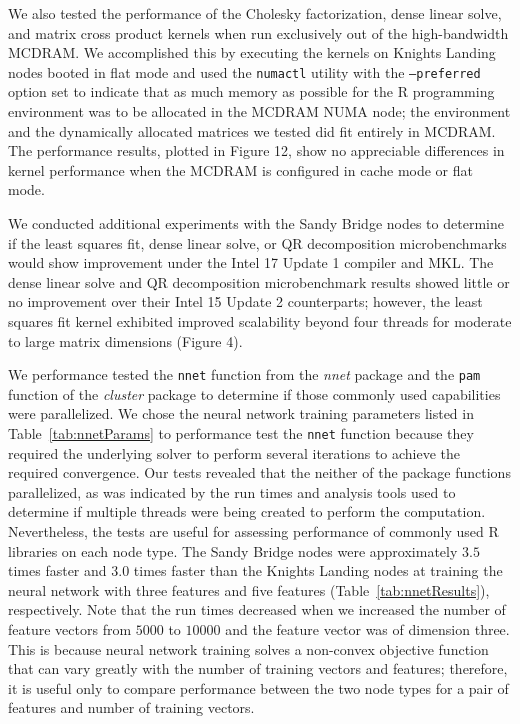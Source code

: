 We also tested the performance of the Cholesky factorization, dense linear
  solve, and matrix cross product kernels when run exclusively out of the
  high-bandwidth MCDRAM.
We accomplished this by executing the kernels on Knights Landing nodes booted in
  flat mode and used the \texttt{numactl} utility with the \texttt{--preferred} option
  set to indicate that as much memory as possible for the R programming
  environment was to be allocated in the MCDRAM NUMA node; the environment and
  the dynamically allocated matrices we tested did fit entirely in MCDRAM.
The performance results, plotted in Figure 12, show no appreciable differences
  in kernel performance when the MCDRAM is configured in cache mode or flat
  mode.

We conducted additional experiments with the Sandy Bridge nodes to determine if
  the least squares fit, dense linear solve, or QR decomposition microbenchmarks
  would show improvement under the Intel 17 Update 1 compiler and MKL.
The dense linear solve and QR decomposition microbenchmark results showed little
  or no improvement over their Intel 15 Update 2 counterparts; however, the
  least squares fit kernel exhibited improved scalability beyond four threads
  for moderate to large matrix dimensions (Figure 4).

We performance tested the \texttt{nnet} function from the \textit{nnet} package
  and the \texttt{pam} function of the \textit{cluster} package to determine if
  those commonly used capabilities were parallelized.
We chose the neural network training parameters listed in Table~\ref{tab:nnetParams} to
  performance test the \texttt{nnet} function because they required the
  underlying solver to perform several iterations to achieve the required
  convergence.
Our tests revealed that the neither of the package functions parallelized, as
  was indicated by the run times and analysis tools used to determine if
  multiple threads were being created to perform the computation.
Nevertheless, the tests are useful for assessing performance of commonly used R
  libraries on each node type.
The Sandy Bridge nodes were approximately $3.5$ times faster and $3.0$ times
  faster than the Knights Landing nodes at training the neural network with
  three features and five features (Table~\ref{tab:nnetResults}), respectively.
Note that the run times decreased when we increased the number of feature
  vectors from $5000$ to $10000$ and the feature vector was of dimension three.
This is because neural network training solves a non-convex objective function
  that can vary greatly with the number of training vectors and features;
  therefore, it is useful only to compare performance between the two node types
  for a pair of features and number of training vectors.

